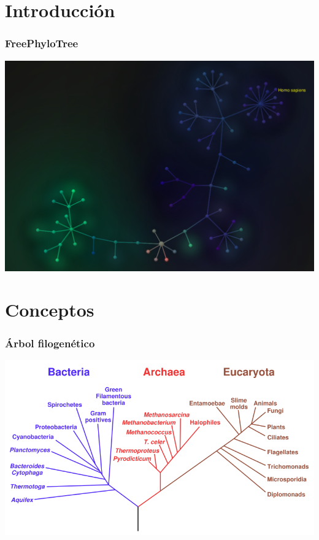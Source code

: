\documentclass[green, compress]{beamer}
\begin{document}
\section{Introducción}
\begin{frame}
\frametitle{FreePhyloTree}
\begin{center}
  \includegraphics[scale=.3]{capture.png}
\end{center}
\end{frame}

\section{Conceptos}

\begin{frame}
\frametitle{Árbol filogenético}
\begin{center}
\includegraphics[scale=.3]{phylogeneticTree.png}
\end{center}
\end{frame}
\end{document}

